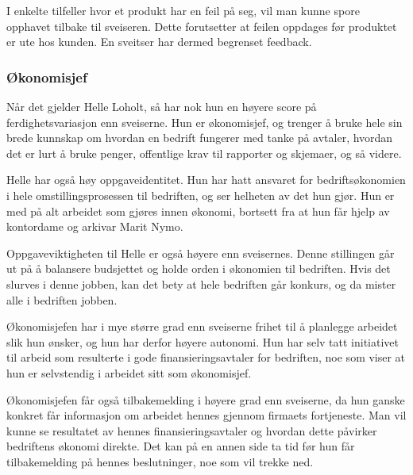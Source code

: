 I enkelte tilfeller hvor et produkt har en feil på seg, vil man kunne spore opphavet tilbake til sveiseren.
Dette forutsetter at feilen oppdages før produktet er ute hos kunden.
En sveitser har dermed begrenset feedback.

\subsubsection{Økonomisjef}
Når det gjelder Helle Loholt, så har nok hun en høyere score på ferdighetsvariasjon enn sveiserne. Hun er økonomisjef, og trenger å bruke hele sin brede kunnskap om hvordan en bedrift fungerer med tanke på avtaler, hvordan det er lurt å bruke penger, offentlige krav til rapporter og skjemaer, og så videre.

Helle har også høy oppgaveidentitet. Hun har hatt ansvaret for bedriftsøkonomien i hele omstillingsprosessen til bedriften, og ser helheten av det hun gjør. Hun er med på alt arbeidet som gjøres innen økonomi, bortsett fra at hun får hjelp av kontordame og arkivar Marit Nymo.

Oppgaveviktigheten til Helle er også høyere enn sveisernes. Denne stillingen går ut på å balansere budsjettet og holde orden i økonomien til bedriften. Hvis det slurves i denne jobben, kan det bety at hele bedriften går konkurs, og da mister alle i bedriften jobben.

Økonomisjefen har i mye større grad enn sveiserne frihet til å planlegge arbeidet slik hun ønsker, og hun har derfor høyere autonomi. Hun har selv tatt initiativet til arbeid som resulterte i gode finansieringsavtaler for bedriften, noe som viser at hun er selvstendig i arbeidet sitt som økonomisjef.

Økonomisjefen får også tilbakemelding i høyere grad enn sveiserne, da hun ganske konkret får informasjon om arbeidet hennes gjennom firmaets fortjeneste. Man vil kunne se resultatet av hennes finansieringsavtaler og hvordan dette påvirker bedriftens økonomi direkte. Det kan på en annen side ta tid før hun får tilbakemelding på hennes beslutninger, noe som vil trekke ned.
	
